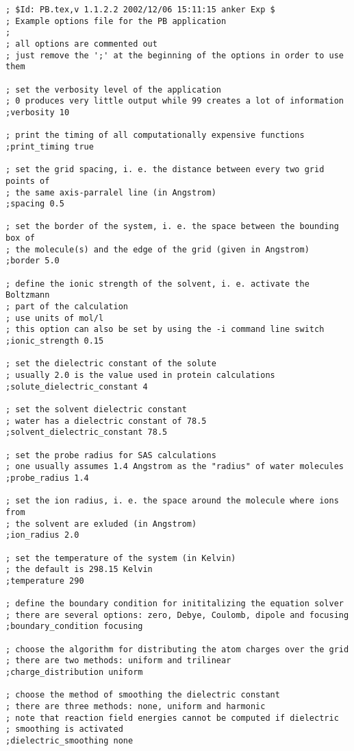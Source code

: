 \documentclass[12pt,twoside,a4paper]{article}
\begin{document}
\scriptsize
\begin{verbatim}
; $Id: PB.tex,v 1.1.2.2 2002/12/06 15:11:15 anker Exp $
; Example options file for the PB application
;
; all options are commented out
; just remove the ';' at the beginning of the options in order to use them

; set the verbosity level of the application 
; 0 produces very little output while 99 creates a lot of information
;verbosity 10 

; print the timing of all computationally expensive functions
;print_timing true

; set the grid spacing, i. e. the distance between every two grid points of
; the same axis-parralel line (in Angstrom)
;spacing 0.5

; set the border of the system, i. e. the space between the bounding box of
; the molecule(s) and the edge of the grid (given in Angstrom)
;border 5.0

; define the ionic strength of the solvent, i. e. activate the Boltzmann
; part of the calculation
; use units of mol/l
; this option can also be set by using the -i command line switch
;ionic_strength 0.15

; set the dielectric constant of the solute
; usually 2.0 is the value used in protein calculations
;solute_dielectric_constant 4

; set the solvent dielectric constant
; water has a dielectric constant of 78.5
;solvent_dielectric_constant 78.5

; set the probe radius for SAS calculations
; one usually assumes 1.4 Angstrom as the "radius" of water molecules
;probe_radius 1.4

; set the ion radius, i. e. the space around the molecule where ions from
; the solvent are exluded (in Angstrom)
;ion_radius 2.0

; set the temperature of the system (in Kelvin)
; the default is 298.15 Kelvin
;temperature 290

; define the boundary condition for inititalizing the equation solver
; there are several options: zero, Debye, Coulomb, dipole and focusing
;boundary_condition focusing

; choose the algorithm for distributing the atom charges over the grid
; there are two methods: uniform and trilinear
;charge_distribution uniform

; choose the method of smoothing the dielectric constant
; there are three methods: none, uniform and harmonic
; note that reaction field energies cannot be computed if dielectric
; smoothing is activated
;dielectric_smoothing none


\end{verbatim}
\end{document}
